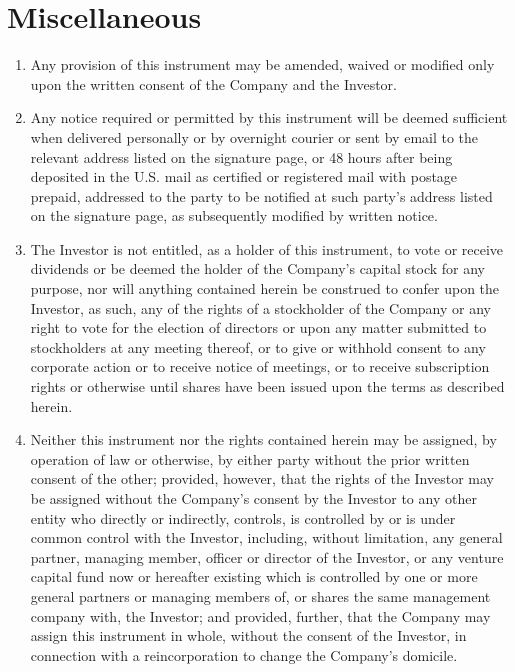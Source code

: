 \documentclass[12pt,letterpaper,fullpage]{article}
\begin{document}
\section{Miscellaneous}
\label{sec:miscellaneous}

\begin{enumerate}[label=(\alph*)]

\item {Any provision of this instrument may be amended, waived or modified only upon the written consent of the Company and the Investor. }

\item {\begin{sloppypar}Any notice required or permitted by this instrument will be
    deemed sufficient when delivered personally or by overnight
    courier or sent by email to the relevant address listed on the
    signature page, or 48 hours after being deposited in the U.S. mail
    as certified or registered mail with postage prepaid, addressed to
    the party to be notified at such party’s address listed on the
    signature page, as subsequently modified by written notice.\end{sloppypar}}

\item {The Investor is not entitled, as a holder of this instrument,
    to vote or receive dividends or be deemed the holder of the
    Company’s capital stock for any purpose, nor will anything
    contained herein be construed to confer upon the Investor, as
    such, any of the rights of a stockholder of the Company or any
    right to vote for the election of directors or upon any matter
    submitted to stockholders at any meeting thereof, or to give or
    withhold consent to any corporate action or to receive notice of
    meetings, or to receive subscription rights or otherwise until
    shares have been issued upon the terms as described herein.}

\item {\begin{sloppypar}Neither this instrument nor the rights contained herein may be
    assigned, by operation of law or otherwise, by either party
    without the prior written consent of the other; provided, however,
    that the rights of the Investor may be assigned without the
    Company’s consent by the Investor to any other entity who directly
    or indirectly, controls, is controlled by or is under common
    control with the Investor, including, without limitation, any
    general partner, managing member, officer or director of the
    Investor, or any venture capital fund now or hereafter existing
    which is controlled by one or more general partners or managing
    members of, or shares the same management company with, the
    Investor; and provided, further, that the Company may assign this
    instrument in whole, without the consent of the Investor, in
    connection with a reincorporation to change the Company’s
    domicile.\end{sloppypar}}


\end{enumerate}
\end{document}
